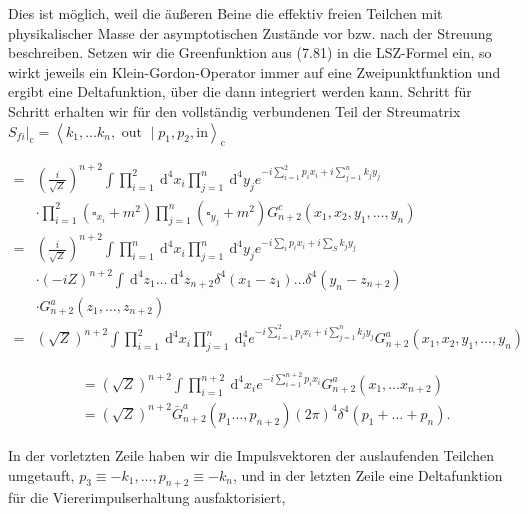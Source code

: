 \documentclass[10pt, letterpaper]{article}
\begin{document}
Dies ist möglich, weil die äußeren Beine die effektiv freien Teilchen mit physikalischer Masse der asymptotischen Zustände vor bzw. nach der Streuung beschreiben. Setzen wir die Greenfunktion aus (7.81) in die LSZ-Formel ein, so wirkt jeweils ein Klein-Gordon-Operator immer auf eine Zweipunktfunktion und ergibt eine Deltafunktion, über die dann integriert werden kann. Schritt für Schritt erhalten wir für den vollständig verbundenen Teil der Streumatrix\\
$\left.S_{f i}\right|_{\mathrm{c}}=\left\langle k_{1}, \ldots k_{n}, \text { out } \mid p_{1}, p_{2}, \mathrm{in}\right\rangle_{\mathrm{c}}$

$$
\begin{aligned}
= & \left(\frac{i}{\sqrt{Z}}\right)^{n+2} \int \prod_{i=1}^{2} \mathrm{~d}^{4} x_{i} \prod_{j=1}^{n} \mathrm{~d}^{4} y_{j} e^{-i \sum_{i=1}^{2} p_{i} x_{i}+i \sum_{j=1}^{n} k_{j} y_{j}} \\
& \cdot \prod_{i=1}^{2}\left(\square_{x_{i}}+m^{2}\right) \prod_{j=1}^{n}\left(\square_{y_{j}}+m^{2}\right) G_{n+2}^{c}\left(x_{1}, x_{2}, y_{1}, \ldots, y_{n}\right) \\
= & \left(\frac{i}{\sqrt{Z}}\right)^{n+2} \int \prod_{i=1}^{n} \mathrm{~d}^{4} x_{i} \prod_{j=1}^{n} \mathrm{~d}^{4} y_{j} e^{-i \sum_{i} p_{i} x_{i}+i \sum_{S} k_{j} y_{j}} \\
& \cdot(-i Z)^{n+2} \int \mathrm{~d}^{4} z_{1} \ldots \mathrm{~d}^{4} z_{n+2} \delta^{4}\left(x_{1}-z_{1}\right) \ldots \delta^{4}\left(y_{n}-z_{n+2}\right) \\
& \cdot G_{n+2}^{a}\left(z_{1}, \ldots, z_{n+2}\right) \\
= & (\sqrt{Z})^{n+2} \int \prod_{i=1}^{2} \mathrm{~d}^{4} x_{i} \prod_{j=1}^{n} \mathrm{~d}_{i}^{4} e^{-i \sum_{i=1}^{2} p_{i} x_{i}+i \sum_{j=1}^{n} k_{j} y_{j}} G_{n+2}^{a}\left(x_{1}, x_{2}, y_{1}, \ldots, y_{n}\right)
\end{aligned}
$$

$$
\begin{aligned}
& =(\sqrt{Z})^{n+2} \int \prod_{i=1}^{n+2} \mathrm{~d}^{4} x_{i} e^{-i \sum_{i=1}^{n+2} p_{i} x_{i}} G_{n+2}^{a}\left(x_{1}, \ldots x_{n+2}\right) \\
& =(\sqrt{Z})^{n+2} \bar{G}_{n+2}^{a}\left(p_{1} \ldots, p_{n+2}\right)(2 \pi)^{4} \delta^{4}\left(p_{1}+\ldots+p_{n}\right) .
\end{aligned}
$$

In der vorletzten Zeile haben wir die Impulsvektoren der auslaufenden Teilchen umgetauft, $p_{3} \equiv-k_{1}, \ldots, p_{n+2} \equiv-k_{n}$, und in der letzten Zeile eine Deltafunktion für die Viererimpulserhaltung ausfaktorisiert,
\end{document}
